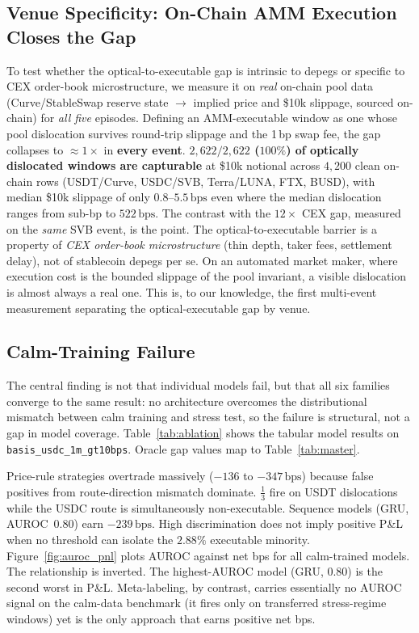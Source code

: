 \documentclass[sigconf,anonymous,natbib=false]{acmart}
\newcommand{\bps}{\,\text{bps}}
\newcommand{\task}[1]{\texttt{\small #1}}
\begin{document}
\subsection{Venue Specificity: On-Chain AMM Execution Closes the Gap}
\label{sec:venue}
To test whether the optical-to-executable gap is intrinsic to depegs or specific to
CEX order-book microstructure, we measure it on \emph{real} on-chain pool data
(Curve/StableSwap reserve state $\to$ implied price and \$10k slippage, sourced
on-chain) for \emph{all five} episodes. Defining an AMM-executable window as one
whose pool dislocation survives round-trip slippage and the 1\,bp swap fee, the gap
collapses to $\approx\!1\times$ in \textbf{every event}. \textbf{$2{,}622/2{,}622$
($100\%$) of optically dislocated windows are capturable} at \$10k notional across
$4{,}200$ clean on-chain rows (USDT/Curve, USDC/SVB, Terra/LUNA, FTX, BUSD), with
median \$10k slippage of only $0.8$--$5.5\bps$ even where the median dislocation
ranges from sub-bp to $522\bps$. The contrast with the $12\times$ CEX gap, measured
on the \emph{same} SVB event, is the point. The optical-to-executable barrier is a
property of \emph{CEX order-book microstructure} (thin depth, taker fees, settlement
delay), not of stablecoin depegs per se. On an automated market maker, where
execution cost is the bounded slippage of the pool invariant, a visible dislocation
is almost always a real one. This is, to our knowledge, the first multi-event
measurement separating the optical-executable gap by venue.

\subsection{Calm-Training Failure}
\label{sec:ladder}

The central finding is not that individual models fail, but that all
six families converge to the same result: no architecture overcomes the
distributional mismatch between calm training and stress test, so the
failure is structural, not a gap in model coverage.
Table~\ref{tab:ablation} shows the tabular model results on
\task{basis\_usdc\_1m\_gt10bps}. Oracle gap values map to
Table~\ref{tab:master}.

Price-rule strategies overtrade massively ($-136$ to $-347\bps$) because
false positives from route-direction mismatch dominate. $\frac{1}{3}$ fire on USDT
dislocations while the USDC route is simultaneously non-executable.
Sequence models (GRU, AUROC~0.80) earn $-239\bps$. High discrimination does not
imply positive P\&L when no threshold can isolate the $2.88\%$ executable minority.
Figure~\ref{fig:auroc_pnl} plots AUROC against net bps for all calm-trained models.
The relationship is inverted. The highest-AUROC model (GRU, 0.80) is the second
worst in P\&L. Meta-labeling, by contrast, carries essentially no AUROC signal
on the calm-data benchmark (it fires only on transferred stress-regime windows)
yet is the only approach that earns positive net bps.
\end{document}
